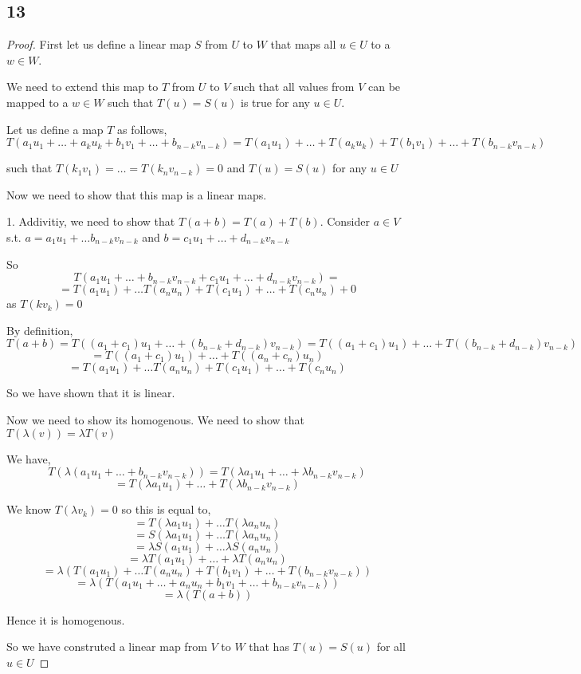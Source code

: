 \documentclass[a4paper]{report}
\begin{document}
\subsection*{13}
\begin{proof}
    First let us define a linear map $ S$  from $U$ to $W$ that maps all $u \in U$ to a  $w \in W$.

    We need to extend this map to $T$ from  $U$ to $V$  such that all values from  $V$ can be mapped to a $w \in W$ such that $T(u) = S(u) $ is true for any $u \in U$.

    Let us define a map $T$ as follows, 
    $$ T(a_1u_1+\dots + a_ku_k + b_1v_1+\dots + b_{n - k}v_{n - k}) = T(a_1u_1) + \dots + T(a_ku_k) + T(b_1v_1) + \dots + T(b_{n - k}v_{n - k}) $$ 

    such that $T(k_1v_1) = \dots = T(k_nv_{n - k}) = 0$ and $T(u) = S(u)$ for any  $u \in U$

    Now we need to show that this map is a linear maps.


    1. Addivitiy, we need to show that $T(a + b) = T(a) + T(b)$. Consider  $a \in V$ s.t. $a = a_1u_1 + \dots b_{n-k}v_{n-k}$ and $b = c_1u_1+ \dots + d_{n-k}v_{n-k}$

    So $$T(a_1u_1+ \dots + b_{n-k}v_{n-k} + c_1u_1 + \dots + d_{n-k}v_{n-k}) = $$
    $$ = T(a_1u_1) + \dots T(a_nu_n) + T(c_1u_1) + \dots + T(c_nu_n) + 0$$  as $T(kv_k) = 0$
    
    By definition, 
    $$ T(a + b ) = T((a_1+c_1)u_1 + \dots + (b_{n-k} + d_{n-k})v_{n-k})  = T((a_1+c_1)u_1) + \dots + T((b_{n-k} + d_{n-k})v_{n-k}) $$ 
    $$ = T((a_1+c_1)u_1) + \dots + T((a_n + c_n)u_n) $$ 
    $$ = T(a_1u_1) + \dots T(a_nu_n) + T(c_1u_1) + \dots + T(c_nu_n)$$

    So we have shown that it is linear.

    Now we need to show its homogenous. We need to show that $T(\lambda(v)) = \lambda T(v)$

    We have, 
    $$ T(\lambda(a_1u_1+ \dots + b_{n-k}v_{n-k}))  = T(\lambda a_1u_1+ \dots + \lambda b_{n-k}v_{n-k})$$ 
    $$ = T(\lambda a_1u_1)+ \dots + T(\lambda b_{n-k}v_{n-k}) $$ 

    We know $T(\lambda v_k) = 0$ so this is equal to,  
    $$ = T(\lambda a_1u_1) + \dots T(\lambda a_nu_n) $$ 
    $$ = S(\lambda a_1u_1) + \dots T(\lambda a_nu_n) $$ 
    $$ = \lambda S(a_1u_1) + \dots \lambda S(a_nu_n) $$ 
    $$ =\lambda T(a_1u_1) + \dots + \lambda T(a_nu_n)$$ 
    $$ = \lambda (T(a_1u_1) + \dots T(a_nu_n) + T(b_1v_1) + \dots + T(b_{n-k}v_{n-k}))$$ 
    $$ =\lambda(T(a_1u_1+\dots + a_nu_n + b_1v_1+\dots+b_{n-k}v_{n-k})) $$ 
    $$ = \lambda(T(a+b)) $$ 

    Hence it is homogenous.

    So we have construted a linear map from $V$ to $W$ that has $T(u) = S(u)$ for all $u \in U$













    
\end{proof}
\end{document}
